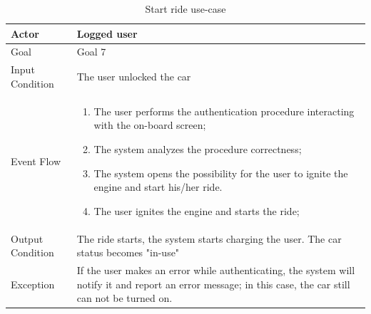 \begin{table}[H]
\begin{center}
\begin{tabular}{p{} | p{}}
\hline
Actor & Logged user\\
\hline
Goal & Goal 7\\
\hline
Input Condition & The user unlocked the car\\
\hline
Event Flow & 
\begin{enumerate}
\item The user performs the authentication procedure interacting with the on-board screen;
\item The system analyzes the procedure correctness;
\item The system opens the possibility for the user to ignite the engine and start his/her ride.
\item The user ignites the engine and starts the ride;
\end{enumerate} \\
\hline
Output Condition & The ride starts, the system starts charging the user. The car status becomes "in-use"\\
\hline
Exception & If the user makes an error while authenticating, the system will notify it and report an error message; in this case, the car still can not be turned on.\\
\hline
\end{tabular}
\end{center}
\caption{Start ride use-case}
\label{start_ride_uc}
\end{table}